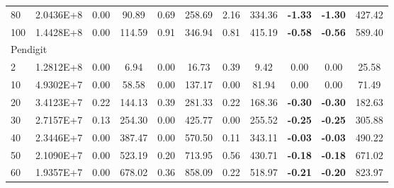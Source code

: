 {\begin{longtable}{@{}llccccccccc@{}}
\multicolumn{1}{l|}{80}  & \multicolumn{1}{l|}{2.0436E+8}  & 0.00 & \multicolumn{1}{c|}{90.89}   & 0.69 & \multicolumn{1}{c|}{258.69}  & 2.16 & \multicolumn{1}{c|}{334.36}  & \textbf{-1.33} & \textbf{-1.30} & 427.42  \\
\multicolumn{1}{l|}{100} & \multicolumn{1}{l|}{1.4428E+8}  & 0.00 & \multicolumn{1}{c|}{114.59}  & 0.91 & \multicolumn{1}{c|}{346.94}  & 0.81 & \multicolumn{1}{c|}{415.19}  & \textbf{-0.58} & \textbf{-0.56} & 589.40  \\ \hline
\multicolumn{11}{l}{Pendigit}                                                                                                                                                                                            \\ \hline
\multicolumn{1}{l|}{2}   & \multicolumn{1}{l|}{1.2812E+8}  & 0.00 & \multicolumn{1}{c|}{6.94}    & 0.00 & \multicolumn{1}{c|}{16.73}   & 0.39 & \multicolumn{1}{c|}{9.42}    & 0.00           & 0.00           & 25.58   \\
\multicolumn{1}{l|}{10}  & \multicolumn{1}{l|}{4.9302E+7}  & 0.00 & \multicolumn{1}{c|}{58.58}   & 0.00 & \multicolumn{1}{c|}{137.17}  & 0.00 & \multicolumn{1}{c|}{81.94}   & 0.00           & 0.00           & 71.49   \\
\multicolumn{1}{l|}{20}  & \multicolumn{1}{l|}{3.4123E+7}  & 0.22 & \multicolumn{1}{c|}{144.13}  & 0.39 & \multicolumn{1}{c|}{281.33}  & 0.22 & \multicolumn{1}{c|}{168.36}  & \textbf{-0.30} & \textbf{-0.30} & 182.63  \\
\multicolumn{1}{l|}{30}  & \multicolumn{1}{l|}{2.7157E+7}  & 0.13 & \multicolumn{1}{c|}{254.30}  & 0.00 & \multicolumn{1}{c|}{425.77}  & 0.00 & \multicolumn{1}{c|}{255.52}  & \textbf{-0.25} & \textbf{-0.25} & 305.88  \\
\multicolumn{1}{l|}{40}  & \multicolumn{1}{l|}{2.3446E+7}  & 0.00 & \multicolumn{1}{c|}{387.47}  & 0.00 & \multicolumn{1}{c|}{570.50}  & 0.11 & \multicolumn{1}{c|}{343.11}  & \textbf{-0.03} & \textbf{-0.03} & 490.22  \\
\multicolumn{1}{l|}{50}  & \multicolumn{1}{l|}{2.1090E+7}  & 0.00 & \multicolumn{1}{c|}{523.19}  & 0.20 & \multicolumn{1}{c|}{713.95}  & 0.56 & \multicolumn{1}{c|}{430.71}  & \textbf{-0.18} & \textbf{-0.18} & 671.02  \\
\multicolumn{1}{l|}{60}  & \multicolumn{1}{l|}{1.9357E+7}  & 0.00 & \multicolumn{1}{c|}{678.02}  & 0.36 & \multicolumn{1}{c|}{858.09}  & 0.22 & \multicolumn{1}{c|}{518.97}  & \textbf{-0.21} & \textbf{-0.20} & 823.97  \\

\end{longtable}}
